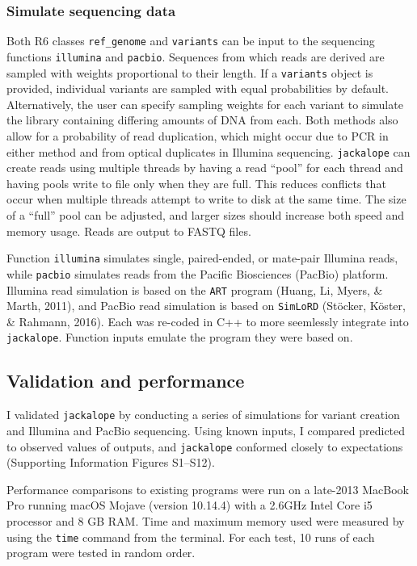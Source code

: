 \documentclass[12pt,]{article}
\begin{document}
\hypertarget{simulate-sequencing-data}{%
\subsubsection{Simulate sequencing data}\label{simulate-sequencing-data}}

Both R6 classes \texttt{ref\_genome} and \texttt{variants} can be input to the sequencing functions
\texttt{illumina} and \texttt{pacbio}.
Sequences from which reads are derived are sampled with weights proportional to
their length.
If a \texttt{variants} object is provided, individual variants are sampled with equal
probabilities by default.
Alternatively, the user can specify sampling weights for each variant
to simulate the library containing differing amounts of DNA from each.
Both methods also allow for a probability of read duplication, which might occur
due to PCR in either method and from optical duplicates in Illumina sequencing.
\texttt{jackalope} can create reads using multiple threads by having a read ``pool'' for
each thread and having pools write to file only when they are full.
This reduces conflicts that occur when multiple threads attempt to write to disk
at the same time.
The size of a ``full'' pool can be adjusted, and larger sizes should increase both
speed and memory usage.
Reads are output to FASTQ files.

Function \texttt{illumina} simulates single, paired-ended, or mate-pair Illumina reads,
while \texttt{pacbio} simulates reads from the Pacific Biosciences (PacBio) platform.
Illumina read simulation is based on the \texttt{ART} program
(Huang, Li, Myers, \& Marth, 2011), and
PacBio read simulation is based on \texttt{SimLoRD} (Stöcker, Köster, \& Rahmann, 2016).
Each was re-coded in C++ to more seemlessly integrate into \texttt{jackalope}.
Function inputs emulate the program they were based on.

\hypertarget{validation-and-performance}{%
\subsection{Validation and performance}\label{validation-and-performance}}

I validated \texttt{jackalope} by conducting a series of simulations for variant creation
and Illumina and PacBio sequencing.
Using known inputs, I compared predicted to observed values of outputs,
and \texttt{jackalope} conformed closely to expectations
(Supporting Information Figures S1--S12).

Performance comparisons to existing programs were run on a late-2013 MacBook
Pro running macOS Mojave (version 10.14.4) with a 2.6GHz Intel Core i5 processor
and 8 GB RAM.
Time and maximum memory used were measured by using the \texttt{time} command from the terminal.
For each test, 10 runs of each program were tested in random order.
\end{document}
